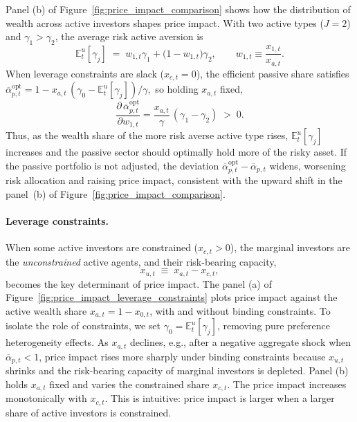 \documentclass[12pt,english]{article}
\begin{document}
Panel (b) of Figure~\ref{fig:price_impact_comparison} shows how the distribution of wealth across active investors shapes price impact. With two active types ($J=2$) and $\gamma_1>\gamma_2$, the average risk active aversion is
\[
\mathbb{E}^u_t[\gamma_j] \;=\; w_{1,t}\gamma_1 + \bigl(1-w_{1,t}\bigr)\gamma_2,
\qquad
w_{1,t}\equiv \frac{x_{1,t}}{x_{a,t}}.
\]
When leverage constraints are slack ($x_{c,t}=0$), the efficient passive share satisfies
\(
\overline{\alpha}_{p,t}^{\mathrm{opt}}
= 1 - x_{a,t}\,(\gamma_0-\mathbb{E}^u_t[\gamma_j])/\gamma,
\)
so holding $x_{a,t}$ fixed,
\[
\frac{\partial\,\overline{\alpha}_{p,t}^{\mathrm{opt}}}{\partial w_{1,t}}
= \frac{x_{a,t}}{\gamma}\,(\gamma_1-\gamma_2) \;>\; 0.
\]
Thus, as the wealth share of the more risk averse active type rises, $\mathbb{E}^u_t[\gamma_j]$ increases and the passive sector should optimally hold more of the risky asset. If the passive portfolio is not adjusted, the deviation $\overline{\alpha}_{p,t}^{\mathrm{opt}}-\overline{\alpha}_{p,t}$ widens, worsening risk allocation and raising price impact, consistent with the upward shift in the panel~(b) of Figure~\ref{fig:price_impact_comparison}.



\paragraph{Leverage constraints.}
When some active investors are constrained ($x_{c,t}>0$), the marginal investors are the \emph{unconstrained} active agents, and their risk-bearing capacity,
\[
x_{u,t}\;\equiv\;x_{a,t}-x_{c,t},
\]
becomes the key determinant of price impact. The panel (a) of Figure~\ref{fig:price_impact_leverage_constraints} plots price impact against the active wealth share $x_{a,t}=1-x_{0,t}$, with and without binding constraints. To isolate the role of constraints, we set $\gamma_0=\mathbb{E}_t^{u}[\gamma_j]$, removing pure preference heterogeneity effects. As $x_{a,t}$ declines, e.g., after a negative aggregate shock when $\overline{\alpha}_{p,t}<1$, price impact rises more sharply under binding constraints because $x_{u,t}$ shrinks and the risk-bearing capacity of marginal investors is depleted. Panel (b) holds $x_{a,t}$ fixed and varies the constrained share $x_{c,t}$. The price impact increases monotonically with $x_{c,t}$. This is intuitive: price impact is larger when a larger share of active investors is constrained.
\end{document}
